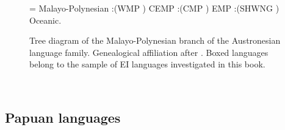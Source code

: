 \begin{figure}

\begin{footnotesize}
\jtree[xunit=8em,yunit=2em]
\! = {Malayo-Polynesian}
:({WMP} {}) {CEMP}
:({CMP} {}) {EMP}
:({SHWNG} {}) {Oceanic}.
\endjtree
\end{footnotesize}

\caption[The Malayo-Polynesian branch of Austronesian]{Tree diagram of the Malayo-Polynesian branch of the Austronesian language family. Genealogical affiliation after \citealt{adelaar2005austronesian}. Boxed languages belong to the sample of EI languages investigated in this book.}\label{fig:Austro}
\end{figure}
\

\subsection{Papuan languages}


